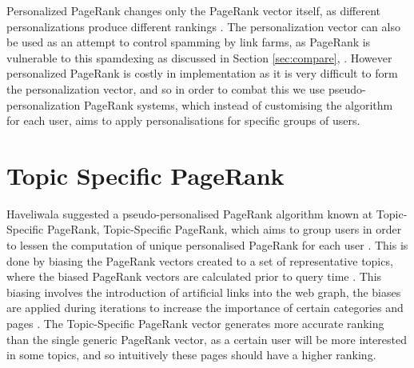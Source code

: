 \documentclass[11pt]{report}
\begin{document}
{Personalized PageRank changes only the PageRank vector itself, as different personalizations produce different rankings \cite{thorson2004modeling}. The personalization vector can also be used as an attempt to control spamming by link farms, as PageRank is vulnerable to this spamdexing as discussed in Section \ref{sec:compare}, \cite{thorson2004modeling}. However personalized PageRank is costly in implementation as it is very difficult to form the personalization vector, and so in order to combat this we use pseudo-personalization PageRank systems, which instead of customising the algorithm for each user, aims to apply personalisations for specific groups of users.

\section{Topic Specific PageRank} \label{sec:Topic specific PR}

Haveliwala suggested a pseudo-personalised PageRank algorithm known at Topic-Specific PageRank, Topic-Specific PageRank, which aims to group users in order to lessen the computation of unique personalised PageRank for each user \cite{haveliwala2002topic}. This is done by biasing the PageRank vectors created to a set of representative topics, where the biased PageRank vectors are calculated prior to query time \cite{haveliwala2002topic, langville}. This biasing involves the introduction of artificial links into the web graph, the biases are applied during iterations to increase the importance of certain categories and pages \cite{haveliwala1999efficient}. The Topic-Specific PageRank vector generates more accurate ranking than the single generic PageRank vector, as a certain user will be more interested in some topics, and so intuitively these pages should have a higher ranking. 

}
\end{document}
